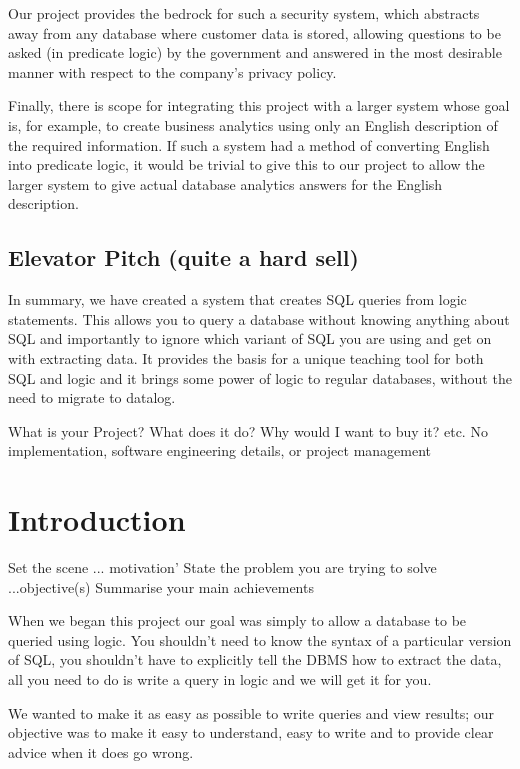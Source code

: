 \documentclass[a4paper, 11pt]{article}
\begin{document}
  Our project provides the bedrock for such a security system, which
  abstracts away from any database where customer data is stored, allowing
  questions to be asked (in predicate logic) by the government and answered in
  the most desirable manner with respect to the company's privacy policy.

  Finally, there is scope for integrating this project with a larger system
  whose goal is, for example, to create business analytics using only an
  English description of the required information. If such a system had a
  method of converting English into predicate logic, it would be trivial to
  give this to our project to allow the larger system to give actual database
  analytics answers for the English description.

  \subsection*{Elevator Pitch (quite a hard sell)}
  In summary, we have created a system that creates SQL queries from logic 
  statements. This allows you to query a database without knowing anything
  about SQL and importantly to ignore which variant of SQL you
  are using and get on with extracting data. It provides the basis for a
  unique teaching tool for both SQL and logic and it brings some power
  of logic to regular databases, without the need to migrate to datalog.

  What is your Project? What does it do? Why would I want to buy it? etc.
  No implementation, software engineering details, or project management

\section{Introduction}

  Set the scene ... motivation'
  State the problem you are trying to solve ...objective(s)
  Summarise your main achievements 

When we began this project our goal was simply to allow a database to be 
queried using logic. You shouldn't need to know the syntax of a particular
version of SQL, you shouldn't have to explicitly tell the DBMS how to extract
the data, all you need to do is write a query in logic and we will
get it for you.

We wanted to make it as easy as possible to write queries and view results;
our objective was to make it easy to understand, easy to write and to
provide clear advice when it does go wrong.
\end{document}
